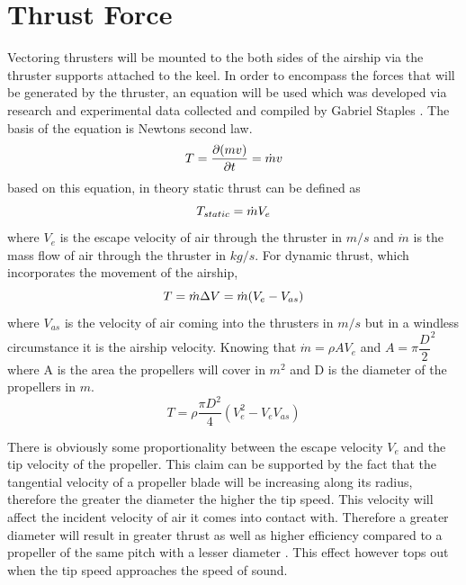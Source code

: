 \documentclass[../main.tex]{subfiles}
\begin{document}
\chapter{Thrust Force} \label{appendix:thrust}

Vectoring thrusters will be mounted to the both sides of the airship via the thruster supports attached to the keel. In order to encompass the forces that will be generated by the thruster, an equation will be used which was developed via research and experimental data collected and compiled by Gabriel Staples \cite{thrusteq}. The basis of the equation is Newtons second law.
	\begin{displaymath}
	T = {\dfrac{\partial (mv)}{\partial t}} = \dot{m}v\\
	\end{displaymath}
		based on this equation, in theory static thrust can be defined as
	\begin{displaymath}
		T_{static}  = \dot{m}V_{e}\\
	\end{displaymath}
	where $V_{e}$ is the escape velocity of air through the thruster in $m/s$ and $\dot{m}$ is the mass flow of air through the thruster in $kg/s$. For dynamic thrust, which incorporates the movement of the airship,
	\begin{displaymath}
	T  = \dot{m}\Delta V = \dot{m}(V_{e}-V_{as})\\
	\end{displaymath}
	where $V_{as}$ is the velocity of air coming into the thrusters in $m/s$ but in a windless circumstance it is the airship velocity. Knowing that $\dot{m} = \rho A V_{e}$ and $A = \pi {\dfrac{D}{2}}^2$ where A is the area the propellers will cover in $m^2$ and D is the diameter of the propellers in $m$.
	\begin{equation}
    \label{eqn:thrusttheoretical}
	T = \rho \dfrac{\pi D^2}{4} (V_{e}^2 - V_{e} V_{as})
	\end{equation}
    
There is obviously some proportionality between the escape velocity $V_{e}$ and the tip velocity of the propeller. This claim can be supported by the fact that the tangential velocity of a propeller blade will be increasing along its radius, therefore the greater the diameter the higher the tip speed. This velocity will affect the incident velocity of air it comes into contact with. Therefore a greater diameter will result in greater thrust as well as higher efficiency compared to a propeller of the same pitch with a lesser diameter \cite{thrusteq}. This effect however tops out when the tip speed approaches the speed of sound.\\
\end{document}
